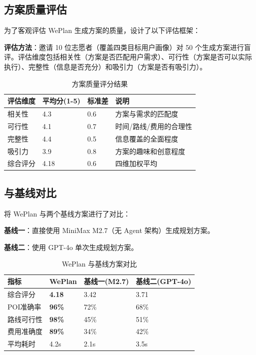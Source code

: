 \documentclass[12pt,a4paper]{ctexart}
\begin{document}
\subsection{方案质量评估}

为了客观评估 WePlan 生成方案的质量，设计了以下评估框架：

\textbf{评估方法}：邀请 10 位志愿者（覆盖四类目标用户画像）对 50 个生成方案进行盲评。评估维度包括相关性（方案是否匹配用户需求）、可行性（方案是否可以实际执行）、完整性（信息是否充分）和吸引力（方案是否有吸引力）。

\begin{table}[H]
\centering
\caption{方案质量评分结果}
\label{tab:quality-scores}
\renewcommand{\arraystretch}{1.3}
\begin{tabular}{p{3cm} p{2.5cm} p{2.5cm} p{4cm}}
\toprule
\textbf{评估维度} & \textbf{平均分(1-5)} & \textbf{标准差} & \textbf{说明} \\
\midrule
相关性 & 4.3 & 0.6 & 方案与需求的匹配度 \\
可行性 & 4.1 & 0.7 & 时间/路线/费用的合理性 \\
完整性 & 4.4 & 0.5 & 信息覆盖的全面程度 \\
吸引力 & 3.9 & 0.8 & 方案的趣味和创意程度 \\
综合评分 & 4.18 & 0.6 & 四维加权平均 \\
\bottomrule
\end{tabular}
\end{table}

\subsection{与基线对比}

将 WePlan 与两个基线方案进行了对比：

\textbf{基线一}：直接使用 MiniMax M2.7（无 Agent 架构）生成规划方案。

\textbf{基线二}：使用 GPT-4o 单次生成规划方案。

\begin{table}[H]
\centering
\caption{WePlan 与基线方案对比}
\label{tab:baseline-compare}
\renewcommand{\arraystretch}{1.3}
\begin{tabular}{p{3cm} p{2.5cm} p{3cm} p{3.5cm}}
\toprule
\textbf{指标} & \textbf{WePlan} & \textbf{基线一(M2.7)} & \textbf{基线二(GPT-4o)} \\
\midrule
综合评分 & \textbf{4.18} & 3.42 & 3.71 \\
POI准确率 & \textbf{96\%} & 72\% & 68\% \\
路线可行性 & \textbf{98\%} & 45\% & 51\% \\
费用准确度 & \textbf{89\%} & 34\% & 42\% \\
平均耗时 & 4.2s & 2.1s & 3.5s \\
\bottomrule
\end{tabular}
\end{table}
\end{document}
